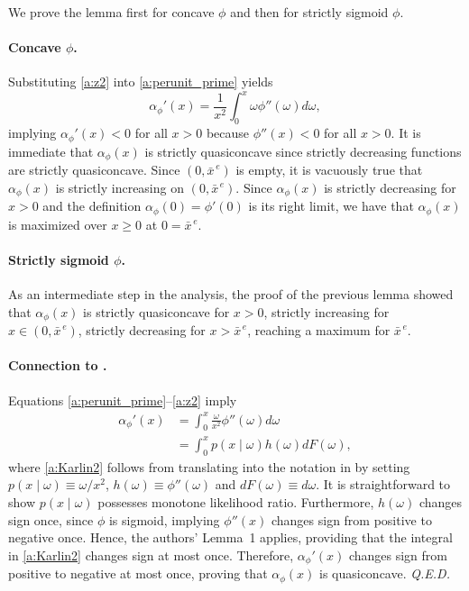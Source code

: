 \documentclass[12pt]{article}
\renewcommand{\qed}{{\it Q.E.D.}}
\newcommand{\efficacy}{\phi}
\newcommand{\xunitbar}{\bar{x}^{\,e}}
\newcommand{\perunit}[1]{\alpha_{#1}}
\begin{document}
We prove the lemma first for concave $\efficacy$ and then for strictly
sigmoid $\efficacy$.

\paragraph{Concave $\efficacy$.} 

Substituting \eqref{a:z2} into \eqref{a:perunit_prime} yields
\begin{equation}
\label{a:aquasiconcave_concave}
\perunit{\efficacy}'\!(x) =\frac{1}{x^2} \int_0^x \omega
\efficacy''(\omega) d\omega,
\end{equation}
implying $\perunit{\efficacy}'\!(x) < 0$ for all $x > 0$ because
$\efficacy''(x) < 0$ for all $x > 0$. It is immediate that
$\perunit{\efficacy}\!(x)$ is strictly quasiconcave since strictly
decreasing functions are strictly quasiconcave. Since $(0,\xunitbar)$
is empty, it is vacuously true that $\perunit{\efficacy}\!(x)$ is
strictly increasing on $(0,\xunitbar)$.  Since
$\perunit{\efficacy}\!(x)$ is strictly decreasing for $x > 0$ and the
definition $\perunit{\efficacy}\!(0) = \efficacy'(0)$ is its right
limit, we have that $\perunit{\efficacy}\!(x)$ is maximized over $x
\geq 0$ at $0 = \xunitbar$.

\paragraph{Strictly sigmoid $\efficacy$.} 

As an intermediate step in the analysis, the proof of the previous
lemma showed that $\perunit{\efficacy}\!(x)$ is strictly quasiconcave
for $x > 0$, strictly increasing for $x \in (0, \xunitbar)$, strictly
decreasing for $x > \xunitbar$, reaching a maximum for $\xunitbar$.

\paragraph{Connection to \citet{Karlin1956}.} 

Equations \eqref{a:perunit_prime}--\eqref{a:z2} imply
\begin{align}
\perunit{\efficacy}'\!(x) & = \int_0^x \frac{\omega}{x^2}
\efficacy''(\omega) d\omega \label{a:Karlin} \\ & = \int_0^x p(x \mid
\omega) h(\omega) dF(\omega), \label{a:Karlin2}
\end{align}
where \eqref{a:Karlin2} follows from translating into the notation in
\citet{Karlin1956} by setting $p(x\mid\omega) \equiv \omega / x^2$,
$h(\omega) \equiv \efficacy''(\omega)$ and $dF(\omega) \equiv
d\omega$. It is straightforward to show $p(x\mid\omega)$ possesses
monotone likelihood ratio. Furthermore, $h(\omega)$ changes sign once,
since $\efficacy$ is sigmoid, implying $\efficacy''(x)$ changes sign
from positive to negative once. Hence, the authors' Lemma~1 applies,
providing that the integral in \eqref{a:Karlin2} changes sign at most
once. Therefore, $\perunit{\efficacy}'\!(x)$ changes sign from
positive to negative at most once, proving that
$\perunit{\efficacy}\!(x)$ is quasiconcave. \qed
\end{document}
